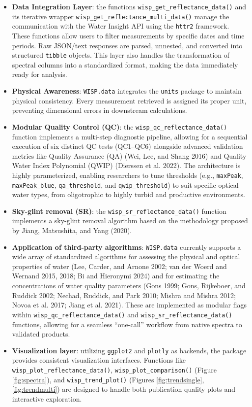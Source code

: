 \documentclass[
]{article}
\providecommand{\tightlist}{%
  \setlength{\itemsep}{0pt}\setlength{\parskip}{0pt}}
\begin{document}
\begin{itemize}
\tightlist
\item
  \textbf{Data Integration Layer}: the functions
  \texttt{wisp\_get\_reflectance\_data()} and its iterative wrapper
  \texttt{wisp\_get\_reflectance\_multi\_data()} manage the
  communication with the Water Insight API using the \texttt{httr2}
  framework. These functions allow users to filter measurements by
  specific dates and time periods. Raw JSON/text responses are parsed,
  unnested, and converted into structured \texttt{tibble} objects. This
  layer also handles the transformation of spectral columns into a
  standardized format, making the data immediately ready for analysis.
\item
  \textbf{Physical Awareness}: \texttt{WISP.data} integrates the
  \texttt{units} package to maintain physical consistency. Every
  measurement retrieved is assigned its proper unit, preventing
  dimensional errors in downstream calculations.
\item
  \textbf{Modular Quality Control (QC)}: the
  \texttt{wisp\_qc\_reflectance\_data()} function implements a
  multi-step diagnostic pipeline, allowing for a sequential execution of
  six distinct QC tests (QC1--QC6) alongside advanced validation metrics
  like Quality Assurance (QA) (Wei, Lee, and Shang 2016) and Quality
  Water Index Polynomial (QWIP) (Dierssen et al. 2022). The architecture
  is highly parameterized, enabling researchers to tune thresholds
  (e.g., \texttt{maxPeak}, \texttt{maxPeak\_blue},
  \texttt{qa\_threshold}, and \texttt{qwip\_threshold}) to suit specific
  optical water types, from oligotrophic to highly turbid and productive
  environments.
\item
  \textbf{Sky-glint removal (SR)}: the
  \texttt{wisp\_sr\_reflectance\_data()} function implements a sky-glint
  removal algorithm based on the methodology proposed by Jiang,
  Matsushita, and Yang (2020).
\item
  \textbf{Application of third-party algorithms}: \texttt{WISP.data}
  currently supports a wide array of standardized algorithms for
  assessing the physical and optical properties of water (Lee, Carder,
  and Arnone 2002; van der Woerd and Wernand 2015, 2018; Bi and
  Hieronymi 2024) and for estimating the concentrations of water quality
  parameters (Gons 1999; Gons, Rijkeboer, and Ruddick 2002; Nechad,
  Ruddick, and Park 2010; Mishra and Mishra 2012; Novoa et al. 2017;
  Jiang et al. 2021). These are implemented as modular flags within
  \texttt{wisp\_qc\_reflectance\_data()} and
  \texttt{wisp\_sr\_reflectance\_data()} functions, allowing for a
  seamless ``one-call'' workflow from native spectra to validated
  products.
\item
  \textbf{Visualization layer}: utilizing \texttt{ggplot2} and
  \texttt{plotly} as backends, the package provides consistent
  visualization interfaces. Functions like
  \texttt{wisp\_plot\_reflectance\_data()},
  \texttt{wisp\_plot\_comparison()} (Figure \ref{fig:spectra}), and
  \texttt{wisp\_trend\_plot()} (Figures \ref{fig:trendsingle},
  \ref{fig:trendmulti}) are designed to handle both publication-quality
  plots and interactive exploration.
\end{itemize}
\end{document}
